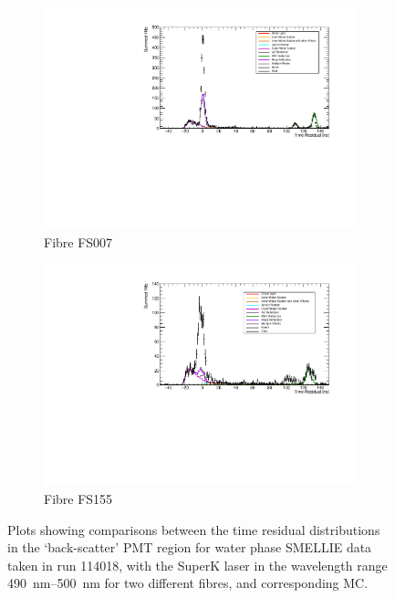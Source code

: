 \begin{figure}
    \centering
    \begin{subfigure}{0.98\textwidth}
        \centering
        \includegraphics[width=\textwidth]{4_SMELLIESimulation/images/tres_plot_backscatter_water_FS007_SUPERK490_500_data_vs_mc_tracked.pdf}
        \caption{Fibre FS007}
        \label{fig:smellie_tres_back_data_vs_mc_fs007}
    \end{subfigure}
    \begin{subfigure}{0.98\textwidth}
        \centering
        \includegraphics[width=\textwidth]{4_SMELLIESimulation/images/tres_plot_backscatter_water_FS155_SUPERK490_500_data_vs_mc_tracked.pdf}
        \caption{Fibre FS155}
        \label{fig:smellie_tres_back_data_vs_mc_fs155}
    \end{subfigure}
    \caption[Data--MC comparisons for water phase SMELLIE data in the back-scatter PMT region]
    {Plots showing comparisons between the time residual distributions in the `back-scatter' PMT region for water phase SMELLIE data taken in run \num{114018}, with the SuperK laser in the wavelength range \SIrange{490}{500}{\nm} for two different fibres, and corresponding MC.}
    \label{fig:smellie_tres_back_data_vs_mc_water}
\end{figure}


